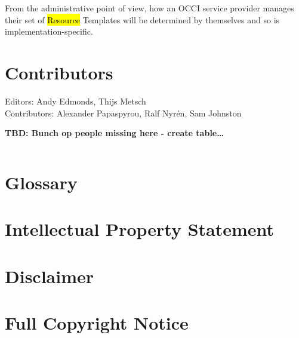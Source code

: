 \documentclass[10pt,a4paper]{article}
\begin{document}

From the administrative point of view, how an OCCI service provider manages their set of 
\hl{Resource} Templates will be determined by themselves and so is implementation-specific.


\section{Contributors}

Editors: Andy Edmonds, Thijs Metsch \\
Contributors: Alexander Papaspyrou, Ralf Nyr\'en, Sam Johnston

\textbf{TBD: Bunch op people missing here - create table\ldots}

\begin{verbatim}

\end{verbatim}

\section{Glossary}


\section{Intellectual Property Statement}


\section{Disclaimer}


\section{Full Copyright Notice}




\end{document}
